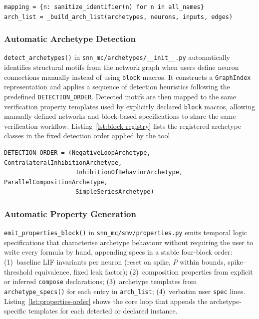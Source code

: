 \documentclass[
]{ceurart}
\begin{document}
\begin{lstlisting}[style=pythoncode,caption={Preparation: sanitisation and archetype merge.},label=lst:prepare-ir]
mapping = {n: sanitize_identifier(n) for n in all_names}
arch_list = _build_arch_list(archetypes, neurons, inputs, edges)
\end{lstlisting}

\subsubsection{Automatic Archetype Detection}

\texttt{detect\_archetypes()} in \texttt{snn\_mc/archetypes/\_\_init\_\_.py}
automatically identifies structural motifs from the network graph when users
define neuron connections manually instead of using \texttt{block} macros. It
constructs a \texttt{GraphIndex} representation and applies a sequence of
detection heuristics following the predefined
\texttt{DETECTION\_ORDER}. Detected motifs are then mapped to the same
verification property templates used by explicitly declared
\texttt{block} macros, allowing manually defined networks and block-based
specifications to share the same verification workflow. Listing~\ref{lst:block-registry}
lists the registered archetype classes in the fixed detection order applied
by the tool.

\begin{lstlisting}[style=pythoncode,caption={Archetype registry and detection order.},label=lst:block-registry]
DETECTION_ORDER = (NegativeLoopArchetype, ContralateralInhibitionArchetype,
                    InhibitionOfBehaviorArchetype, ParallelCompositionArchetype,
                    SimpleSeriesArchetype)
\end{lstlisting}

\subsubsection{Automatic Property Generation}

\texttt{emit\_properties\_block()} in \texttt{snn\_mc/smv/properties.py}
emits temporal logic specifications that characterise archetype behaviour
without requiring the user to write every formula by hand, appending specs
in a stable four-block order: (1)~baseline LIF invariants per neuron (reset
on spike, $P$ within bounds, spike--threshold equivalence, fixed leak
factor); (2)~composition properties from explicit or inferred
\texttt{compose} declarations; (3)~archetype templates from
\texttt{archetype\_specs()} for each entry in \texttt{arch\_list};
(4)~verbatim user \texttt{spec} lines. Listing~\ref{lst:properties-order}
shows the core loop that appends the archetype-specific templates for each
detected or declared instance.
\end{document}
